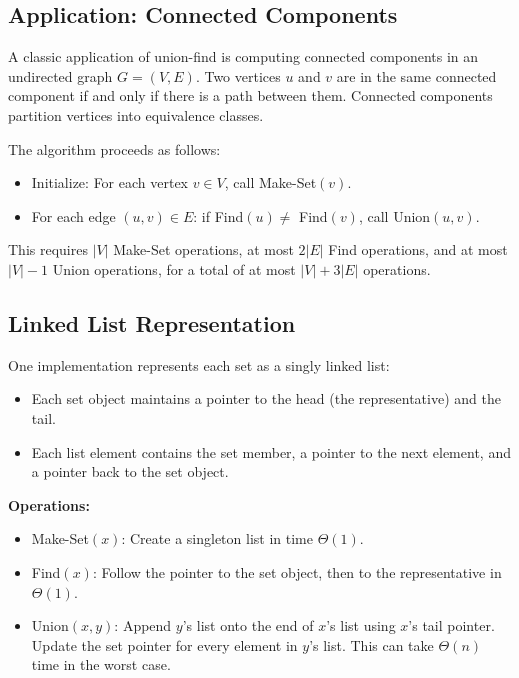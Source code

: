\subsection{Application: Connected Components}

A classic application of union-find is computing connected components in an undirected graph 
$G = (V, E)$. Two vertices $u$ and $v$ are in the same connected component if and only if 
there is a path between them. Connected components partition vertices into equivalence classes.

The algorithm proceeds as follows:
\begin{itemize}[noitemsep]
  \item Initialize: For each vertex $v \in V$, call Make-Set$(v)$.
  \item For each edge $(u, v) \in E$: if Find$(u) \neq$ Find$(v)$, call Union$(u, v)$.
\end{itemize}

This requires $|V|$ Make-Set operations, at most $2|E|$ Find operations, and at most $|V|-1$ 
Union operations, for a total of at most $|V| + 3|E|$ operations.

\subsection{Linked List Representation}

One implementation represents each set as a singly linked list:
\begin{itemize}[noitemsep]
  \item Each set object maintains a pointer to the head (the representative) and the tail.
  \item Each list element contains the set member, a pointer to the next element, and a 
        pointer back to the set object.
\end{itemize}

\textbf{Operations:}
\begin{itemize}[noitemsep]
  \item Make-Set$(x)$: Create a singleton list in time $\Theta(1)$.
  \item Find$(x)$: Follow the pointer to the set object, then to the representative in $\Theta(1)$.
  \item Union$(x, y)$: Append $y$'s list onto the end of $x$'s list using $x$'s tail pointer. 
        Update the set pointer for every element in $y$'s list. This can take $\Theta(n)$ time 
        in the worst case.
\end{itemize}

